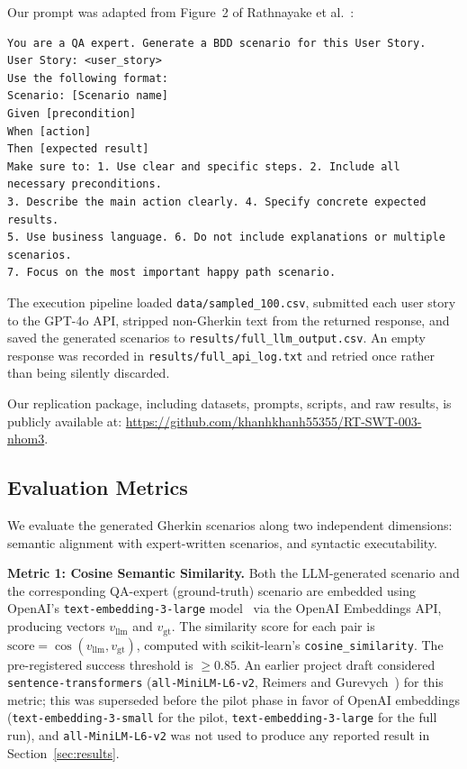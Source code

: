 Our prompt was adapted from Figure~2 of Rathnayake et al.~\cite{rathnayake2026llm}:
\begin{lstlisting}
You are a QA expert. Generate a BDD scenario for this User Story.
User Story: <user_story>
Use the following format:
Scenario: [Scenario name]
Given [precondition]
When [action]
Then [expected result]
Make sure to: 1. Use clear and specific steps. 2. Include all necessary preconditions.
3. Describe the main action clearly. 4. Specify concrete expected results.
5. Use business language. 6. Do not include explanations or multiple scenarios.
7. Focus on the most important happy path scenario.
\end{lstlisting}

The execution pipeline loaded \texttt{data/sampled\_100.csv}, submitted each user story to the GPT-4o API, stripped non-Gherkin text from the returned response, and saved the generated scenarios to \texttt{results/full\_llm\_output.csv}.
An empty response was recorded in \texttt{results/full\_api\_log.txt} and retried once rather than being silently discarded.

Our replication package, including datasets, prompts, scripts, and raw results, is publicly available at: \url{https://github.com/khanhkhanh55355/RT-SWT-003-nhom3}.

\subsection{Evaluation Metrics}
\label{sec:metrics}

We evaluate the generated Gherkin scenarios along two independent dimensions: semantic alignment with expert-written scenarios, and syntactic executability.

\textbf{Metric 1: Cosine Semantic Similarity.}
Both the LLM-generated scenario and the corresponding QA-expert (ground-truth) scenario are embedded using OpenAI's \texttt{text-embedding-3-large} model~\cite{openai2024embeddings} via the OpenAI Embeddings API, producing vectors $v_{\text{llm}}$ and $v_{\text{gt}}$.
The similarity score for each pair is $\text{score} = \cos(v_{\text{llm}}, v_{\text{gt}})$, computed with scikit-learn's \texttt{cosine\_similarity}.
The pre-registered success threshold is $\geq 0.85$.
An earlier project draft considered \texttt{sentence-transformers} (\texttt{all-MiniLM-L6-v2}, Reimers and Gurevych~\cite{reimers2019sentence}) for this metric; this was superseded before the pilot phase in favor of OpenAI embeddings (\texttt{text-embedding-3-small} for the pilot, \texttt{text-embedding-3-large} for the full run), and \texttt{all-MiniLM-L6-v2} was not used to produce any reported result in Section~\ref{sec:results}.

